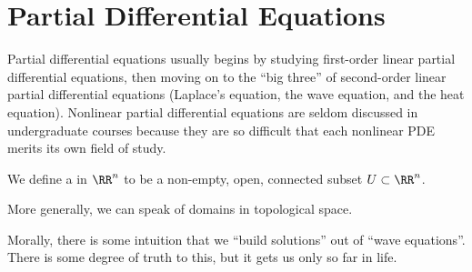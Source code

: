 \chapter{Partial Differential Equations}

\begin{node}\label{pde-0000}%
Partial differential equations usually begins by studying first-order
linear partial differential equations, then moving on to the ``big
three'' of second-order linear partial differential equations (Laplace's
equation, the wave equation, and the heat equation). Nonlinear partial
differential equations are seldom discussed in undergraduate courses
because they are so difficult that each nonlinear PDE merits its own
field of study.
\end{node}

\begin{definition}\label{pde-0001}%
We define a  in $\RR^{n}$ to be a non-empty, open,
connected subset $U\subset\RR^{n}$.

More generally, we can speak of domains in topological space.
\end{definition}

\begin{node}\label{pde-000B}%
Morally, there is some intuition that we ``build solutions'' out of
``wave equations''. There is some degree of truth to this, but it gets
us only so far in life.
\end{node}

